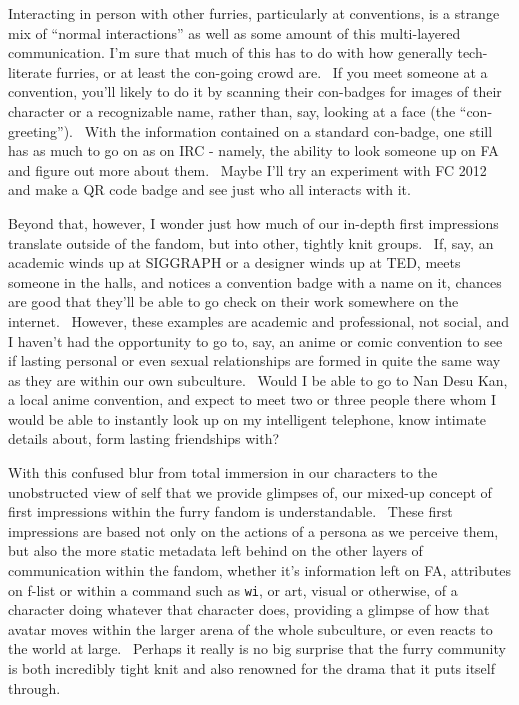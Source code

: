 Interacting in person with other furries, particularly at conventions,
is a strange mix of ``normal interactions'' as well as some amount of
this multi-layered communication. I'm sure that much of this has to do
with how generally tech-literate furries, or at least the con-going
crowd are. ~If you meet someone at a convention, you'll likely to do it
by scanning their con-badges for images of their character or a
recognizable name, rather than, say, looking at a face (the
``con-greeting''). ~With the information contained on a standard
con-badge, one still has as much to go on as on IRC - namely, the
ability to look someone up on FA and figure out more about them. ~Maybe
I'll try an experiment with FC 2012 and make a QR code badge and see
just who all interacts with it.

Beyond that, however, I wonder just how much of our in-depth first
impressions translate outside of the fandom, but into other, tightly
knit groups. ~If, say, an academic winds up at SIGGRAPH or a designer
winds up at TED, meets someone in the halls, and notices a convention
badge with a name on it, chances are good that they'll be able to go
check on their work somewhere on the internet. ~However, these examples
are academic and professional, not social, and I haven't had the
opportunity to go to, say, an anime or comic convention to see if
lasting personal or even sexual relationships are formed in quite the
same way as they are within our own subculture. ~Would I be able to go
to Nan Desu Kan, a local anime convention, and expect to meet two or
three people there whom I would be able to instantly look up on my
intelligent telephone, know intimate details about, form lasting
friendships with?

With this confused blur from total immersion in our characters to the
unobstructed view of self that we provide glimpses of, our mixed-up
concept of first impressions within the furry fandom is understandable.
~These first impressions are based not only on the actions of a persona
as we perceive them, but also the more static metadata left behind on
the other layers of communication within the fandom, whether it's
information left on FA, attributes on f-list or within a command such as
\texttt{wi}, or art, visual or otherwise, of a character doing whatever
that character does, providing a glimpse of how that avatar moves within
the larger arena of the whole subculture, or even reacts to the world at
large. ~Perhaps it really is no big surprise that the furry community is
both incredibly tight knit and also renowned for the drama that it puts
itself through.
